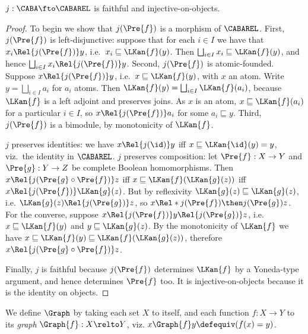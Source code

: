 \begin{lemma}
  \label{lemma:j-faithful}
  \(j : \CABA \fto \CABAREL\) is faithful and injective-on-objects.
\end{lemma}
\begin{proof}
  To begin we show that \(j(\Pre{f})\) is a morphism of \(\CABAREL\). First,
  \(j(\Pre{f})\) is left-disjunctive: suppose that for each \(i \in I\) we have
  that \(x_i \Rel{j(\Pre{f})} y\), i.e.\ \(x_i \sqsubseteq \LKan{f}(y)\). Then
  \(\bigsqcup_{i \in I} x_i \sqsubseteq \LKan{f}(y)\), and hence \(\bigsqcup_{i
  \in I} x_i \Rel{j(\Pre{f})} y\).
  Second, \(j(\Pre{f})\) is atomic-founded. Suppose \(x \Rel{j(\Pre{f})} y\),
  i.e.\ \(x \sqsubseteq \LKan{f}(y)\), with \(x\) an atom. Write $y =
  \bigsqcup_{i \in I} a_i$ for $a_i$ atoms. Then $\LKan{f}(y) = \bigsqcup_{i \in
  I} \LKan{f}(a_i)$, because $\LKan{f}$ is a left adjoint and preserves joins.
  As \(x\) is an atom, $x \sqsubseteq \LKan{f}(a_i)$ for a particular $i \in I$, so $x
  \Rel{j(\Pre{f})} a_i$ for some $a_i \sqsubseteq y$.
  Third, $j(\Pre{f})$ is a bimodule, by monotonicity of $\LKan{f}$.

  $j$ preserves identities: we have \(x \Rel{j(\id)} y\) iff \(x \sqsubseteq
  \LKan{\id}(y) = y\), viz.\ the identity in \(\CABAREL\). $j$ preserves
  composition: let \(\Pre{f} : X \to Y\) and \(\Pre{g} : Y \to Z\) be complete
  Boolean homomorphisms. Then
  \(x \Rel{j(\Pre{g} \circ \Pre{f})} z\)
  iff
  \(x \sqsubseteq \LKan{f}(\LKan{g}(z))\)
  iff
  \(x \Rel{j(\Pre{f})} \LKan{g}(z)\).
  But by reflexivity
  $\LKan{g}(z) \sqsubseteq \LKan{g}(z)$,
  i.e.
  \(\LKan{g}(z) \Rel{j(\Pre{g})} z\),
  so
  \(x \Rel*{j(\Pre{f}) \then j(\Pre{g})} z\).
  For the converse, suppose
  \(x \Rel{j(\Pre{f})} y \Rel{j(\Pre{g})} z\),
  i.e.
  \(x \sqsubseteq \LKan{f}(y)\)
  and
  \(y \sqsubseteq \LKan{g}(z)\).
  By the monotonicity of \(\LKan{f}\) we have
  \(x \sqsubseteq \LKan{f}(y) \sqsubseteq \LKan{f}(\LKan{g}(z))\),
  therefore
  \(x \Rel{j({\Pre{g} \circ \Pre{f}})} z\).

  Finally, \(j\) is faithful because \(j(\Pre{f})\) determines \(\LKan{f}\) by a
  Yoneda-type argument, and hence determines \(\Pre{f}\) too. It is
  injective-on-objects because it is the identity on objects.
\end{proof}

We define $\Graph$ by taking each set $X$ to itself, and each function
\(f : X \to Y\) to its \emph{graph} \(\Graph{f} : X \relto Y\), viz.
\(x \Graph{f} y \defequiv (f(x) = y)\).

